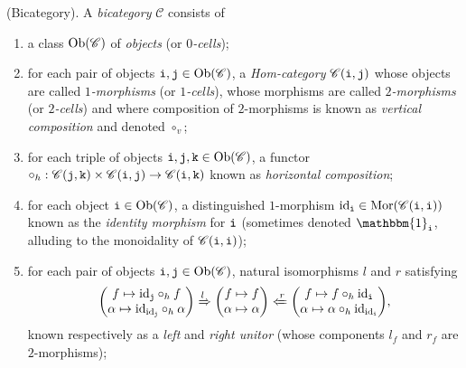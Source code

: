 \noindent\begin{definition}\textup{(Bicategory).} A {\em bicategory} $\mathscr{C}$ consists of
\begin{enumerate}[label=$\bullet$, leftmargin=4\parindent]
\item a class $\textnormal{Ob}(\mathscr{C})$ of {\em objects} (or {\em $0$-cells});
\item for each pair of objects $\textnormal{\texttt{i}}, \textnormal{\texttt{j}} \in \textnormal{Ob}(\mathscr{C})$, a {\em Hom-category} $\mathscr{C}(\textnormal{\texttt{i}}, \textnormal{\texttt{j}})$ whose objects are called {\em $1$-morphisms} (or {\em $1$-cells}), whose morphisms are called {\em $2$-morphisms} (or {\em $2$-cells}) and where composition of $2$-morphisms is known as {\em vertical composition} and denoted $\circ_v$;
\item for each triple of objects $\textnormal{\texttt{i}}, \textnormal{\texttt{j}}, \textnormal{\texttt{k}} \in \textnormal{Ob}(\mathscr{C})$, a functor $\circ_h : \mathscr{C}(\textnormal{\texttt{j}}, \textnormal{\texttt{k}}) \times \mathscr{C}(\textnormal{\texttt{i}}, \textnormal{\texttt{j}}) \to \mathscr{C}(\textnormal{\texttt{i}}, \textnormal{\texttt{k}})$ known as {\em horizontal composition};
\item for each object $\textnormal{\texttt{i}} \in \textnormal{Ob}(\mathscr{C})$, a distinguished $1$-morphism $\textup{id}_{\textnormal{\texttt{i}}} \in \textnormal{Mor}(\mathscr{C}(\textnormal{\texttt{i}}, \textnormal{\texttt{i}}))$ known as the {\em identity morphism} for $\textnormal{\texttt{i}}$ (sometimes denoted $\mathbbm{1}_\textobj{i}$, alluding to the monoidality of $\mathscr{C}(\textnormal{\texttt{i}}, \textnormal{\texttt{i}})$);
\item for each pair of objects $\textnormal{\texttt{i}}, \textnormal{\texttt{j}} \in \textnormal{Ob}(\mathscr{C})$, natural isomorphisms $l$ and $r$ satisfying
\begin{align*}
\begin{split}
\begin{pmatrix}f \mapsto \textup{id}_{\textnormal{\texttt{j}}} \circ_h f\\\alpha \mapsto \textup{id}_{\textup{id}_{\textnormal{\texttt{j}}}} \circ_h \alpha\end{pmatrix} \xRightarrow{l} \begin{pmatrix}f \mapsto f\\\alpha \mapsto \alpha\end{pmatrix} \xLeftarrow{r} \begin{pmatrix}f \mapsto f \circ_h \textup{id}_{\textnormal{\texttt{i}}}\\\alpha \mapsto \alpha \circ_h \textup{id}_{\textup{id}_{\textnormal{\texttt{i}}}}\end{pmatrix}\!,
\end{split}
\end{align*}
known respectively as a {\em left} and {\em right unitor} (whose components $l_f$ and $r_f$ are $2$-morphisms);

\end{enumerate}
\end{definition}
